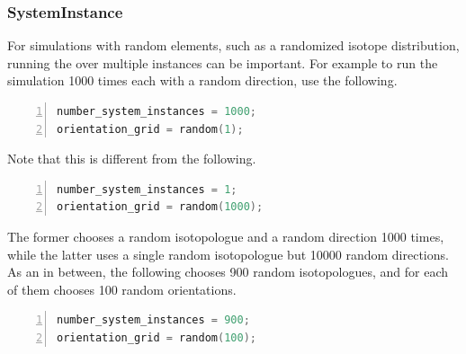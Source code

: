 \documentclass{book}
\begin{document}
\subsubsection{SystemInstance} %
For simulations with random elements, such as a randomized isotope
distribution, running the over multiple instances can be important.
For example to run the simulation 1000 times each with a random direction,
use the following.  
\begin{lstlisting}[frame=single,numbers=left,language=c]
number_system_instances = 1000;
orientation_grid = random(1);
\end{lstlisting}
Note that this is different from the following.
\begin{lstlisting}[frame=single,numbers=left,language=c]
number_system_instances = 1;
orientation_grid = random(1000);
\end{lstlisting}
The former chooses a random isotopologue and a random direction 1000 times,
while the latter uses a single random isotopologue but 10000 random directions.
As an in between, the following chooses 900 random isotopologues, and for
each of them chooses 100 random orientations.
\begin{lstlisting}[frame=single,numbers=left,language=c]
number_system_instances = 900;
orientation_grid = random(100);
\end{lstlisting}
\end{document}
